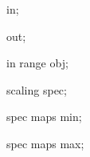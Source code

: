 \newif\ifpgf@dvignore

{

  \attribute in;

  \attribute out;

  \attribute in range obj;
  
  \attribute scaling spec;

  \attribute spec maps min;

  \attribute spec maps max;

}
